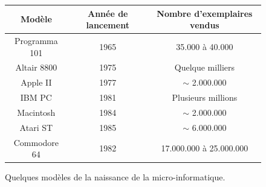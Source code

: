\documentclass[a4paper,12pt]{article}
\begin{document}
\begin{figure}[h!]
\begin{center}
\begin{tabular}{|c|c|c|}
\hline
\textbf{Modèle} & \textbf{Année de lancement} & \textbf{Nombre d'exemplaires vendus} \\
\hline
Programma 101 & 1965 & 35.000 à 40.000 \\
\hline
Altair 8800 & 1975 & Quelque milliers \\
\hline
Apple II & 1977 & $\sim$ 2.000.000 \\
\hline
IBM PC & 1981 & Plusieurs millions \\
\hline
Macintosh & 1984 & $\sim$ 2.000.000 \\
\hline
Atari ST & 1985 & $\sim$ 6.000.000 \\
\hline
Commodore 64 & 1982 & 17.000.000 à 25.000.000 \\
\hline
\end{tabular}
\caption{\footnotesize Quelques modèles de la naissance de la micro-informatique.}
\label{micropc}
\end{center}
\end{figure}
\end{document}
